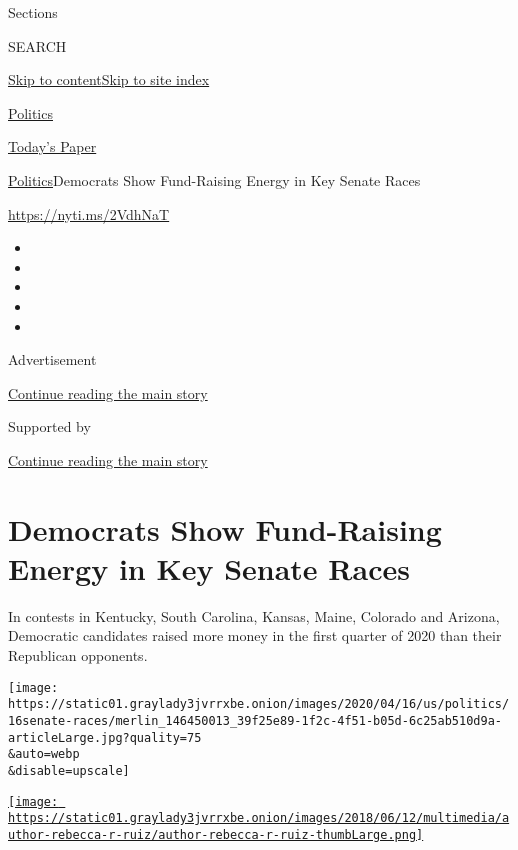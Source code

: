 Sections

SEARCH

\protect\hyperlink{site-content}{Skip to
content}\protect\hyperlink{site-index}{Skip to site index}

\href{https://www.nytimes3xbfgragh.onion/section/politics}{Politics}

\href{https://myaccount.nytimes3xbfgragh.onion/auth/login?response_type=cookie\&client_id=vi}{}

\href{https://www.nytimes3xbfgragh.onion/section/todayspaper}{Today's
Paper}

\href{/section/politics}{Politics}\textbar{}Democrats Show Fund-Raising
Energy in Key Senate Races

\url{https://nyti.ms/2VdhNaT}

\begin{itemize}
\item
\item
\item
\item
\item
\end{itemize}

Advertisement

\protect\hyperlink{after-top}{Continue reading the main story}

Supported by

\protect\hyperlink{after-sponsor}{Continue reading the main story}

\hypertarget{democrats-show-fund-raising-energy-in-key-senate-races}{%
\section{Democrats Show Fund-Raising Energy in Key Senate
Races}\label{democrats-show-fund-raising-energy-in-key-senate-races}}

In contests in Kentucky, South Carolina, Kansas, Maine, Colorado and
Arizona, Democratic candidates raised more money in the first quarter of
2020 than their Republican opponents.

\texttt{[image: https://static01.graylady3jvrrxbe.onion/images/2020/04/16/us/politics/16senate-races/merlin\_146450013\_39f25e89-1f2c-4f51-b05d-6c25ab510d9a-articleLarge.jpg?quality=75\\\&auto=webp\\\&disable=upscale]}

\href{https://www.nytimes3xbfgragh.onion/by/rebecca-r-ruiz}{\texttt{[image: https://static01.graylady3jvrrxbe.onion/images/2018/06/12/multimedia/author-rebecca-r-ruiz/author-rebecca-r-ruiz-thumbLarge.png]}}

